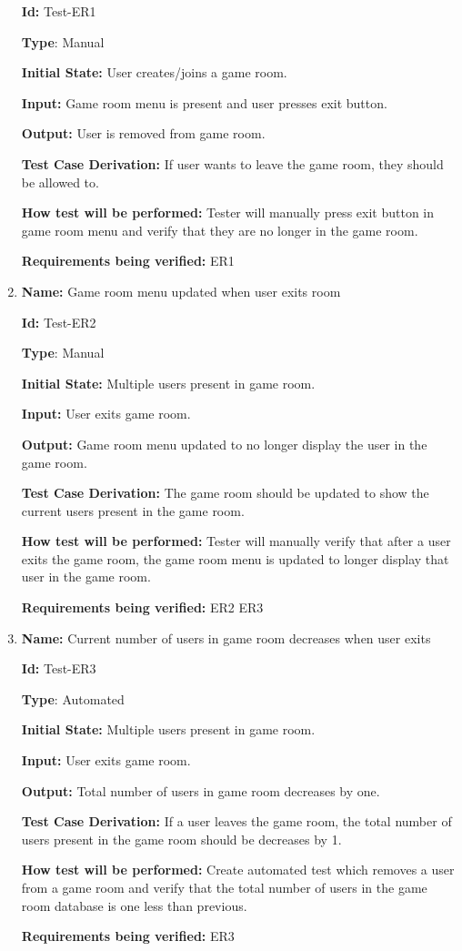 \documentclass[12pt, titlepage]{article}
\begin{document}
\begin{enumerate}
\textbf{Id:} Test-ER1

\textbf{Type}: Manual

\textbf{Initial State:} User creates/joins a game room.

\textbf{Input:} Game room menu is present and user presses exit button.

\textbf{Output:} User is removed from game room.

\textbf{Test Case Derivation:} If user wants to leave the game room, they should be allowed to.

\textbf{How test will be performed:} Tester will manually press exit button in game room menu and verify that they are no longer in the game room.

\textbf{Requirements being verified: } ER1

\item{\textbf{Name:} Game room menu updated when user exits room}

\textbf{Id:} Test-ER2

\textbf{Type}: Manual

\textbf{Initial State:} Multiple users present in game room.

\textbf{Input:} User exits game room.

\textbf{Output:} Game room menu updated to no longer display the user in the game room.

\textbf{Test Case Derivation:} The game room should be updated to show the current users present in the game room.

\textbf{How test will be performed:} Tester will manually verify that after a user exits the game room, the game room menu is updated to longer display that user in the game room.

\textbf{Requirements being verified: } ER2 ER3

\item{\textbf{Name:} Current number of users in game room decreases when user exits}

\textbf{Id:} Test-ER3

\textbf{Type}: Automated

\textbf{Initial State:} Multiple users present in game room.

\textbf{Input:} User exits game room.

\textbf{Output:} Total number of users in game room decreases by one.

\textbf{Test Case Derivation:} If a user leaves the game room, the total number of users present in the game room should be decreases by 1.

\textbf{How test will be performed:} Create automated test which removes a user from a game room and verify that the total number of users in the game room database is one less than previous.

\textbf{Requirements being verified: } ER3

\end{enumerate}
\end{document}
